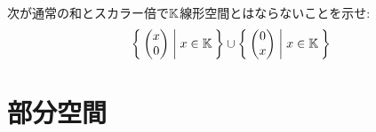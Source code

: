 \begin{quiz}
  次が通常の和とスカラー倍で$\mathbb{K}$線形空間とはならないことを示せ:
  \begin{align*}
    \Set{\begin{pmatrix}x\\0\end{pmatrix}|x\in\mathbb{K}}
    \cup \Set{\begin{pmatrix}0\\x\end{pmatrix}|x\in\mathbb{K}}
  \end{align*}
\end{quiz}

\chapter{部分空間}
